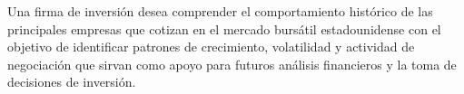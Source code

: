 Una firma de inversión desea comprender el comportamiento histórico de las principales empresas que cotizan en el mercado bursátil estadounidense con el objetivo de identificar patrones de crecimiento, volatilidad y actividad de negociación que sirvan como apoyo para futuros análisis financieros y la toma de decisiones de inversión.
